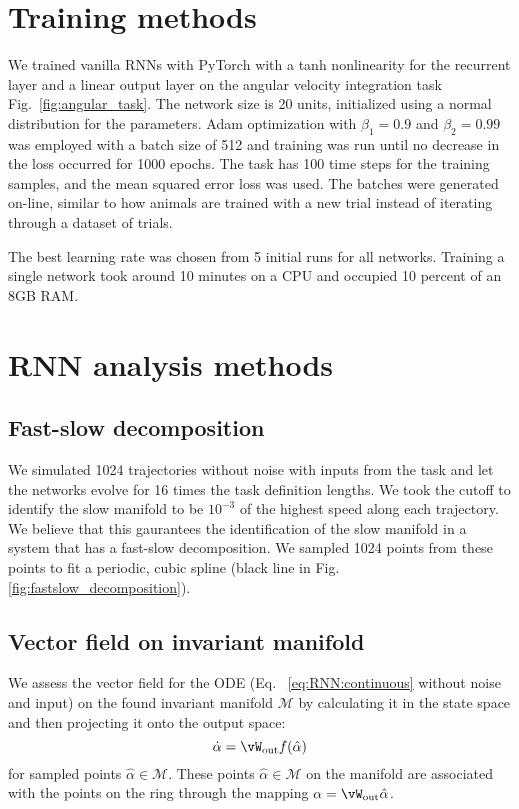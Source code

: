 \documentclass{article} %
\newcounter{ct}
\newcommand{\wout}{\vW_{\text{out}}}
\newcommand{\manifold}{\mathcal{M}}
\theoremstyle{definition}
\theoremstyle{remark}
\begin{document}
 \section{Training methods}
 
 We trained vanilla RNNs with PyTorch \citep{paszke2017automatic} with a tanh nonlinearity for the recurrent layer and a linear output layer on the angular velocity integration task Fig.~\ref{fig:angular_task}.
 The network size is 20 units, initialized using a normal distribution for the parameters.
  Adam optimization with $\beta_1=0.9$ and $\beta_2=0.99$ was employed with a batch size of 512 and training was run until no decrease in the loss occurred for 1000 epochs.
   The task has 100 time steps for the training samples, and the mean squared error loss was used.
The batches were generated on-line, similar to how animals are trained with a new trial instead of iterating through a dataset of trials.

The best learning rate was chosen from 5 initial runs for all networks.
Training a single network took around 10 minutes on a CPU and occupied 10 percent of an 8GB RAM.

 \section{RNN analysis methods}
 
 
 \subsection{Fast-slow decomposition}
 We simulated 1024 trajectories without noise with inputs from the task and let the networks evolve for 16 times the task definition lengths.
 We took the cutoff to identify the slow manifold to be $10^{-3}$ of the highest speed along each trajectory.
 We believe that this gaurantees the identification of the slow manifold in a system that has a fast-slow decomposition.	
 We sampled 1024 points from these points to fit a periodic, cubic spline (black line in Fig.\ref{fig:fastslow_decomposition}).
 
 \subsection{Vector field on invariant manifold}\label{sec:supp:vf}
 
 We assess the vector field for the ODE (Eq.~ \ref{eq:RNN:continuous} without noise and input) on the found invariant manifold $\manifold$ by calculating it in the state space
 and then projecting it onto the output space:
 \begin{equation}
\dot \alpha =  \wout f(\hat \alpha) %
\end{equation}
for sampled points $\hat \alpha\in \manifold$.
These points $\hat \alpha\in \manifold$ on the manifold are associated with the points on the ring through the mapping $\alpha = \wout\hat\alpha$.
 
\end{document}
